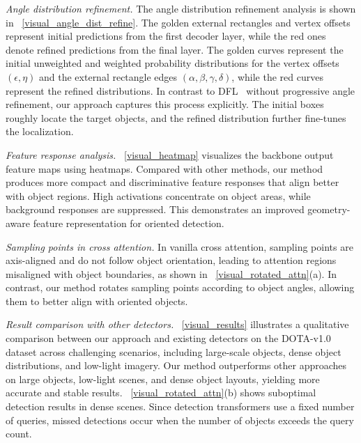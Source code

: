 \documentclass[lettersize,journal]{IEEEtran}
\begin{document}
\visualAngleDistRefine


\heatmap

\visualRoatedAttn


\textit{Angle distribution refinement.}
The angle distribution refinement analysis is shown in \figurename~\ref{visual_angle_dist_refine}. The golden external rectangles and vertex offsets represent initial predictions from the first decoder layer, while the red ones denote refined predictions from the final layer. The golden curves represent the initial unweighted and weighted probability distributions for the vertex offsets $(\epsilon,\eta)$ and the external rectangle edges $(\alpha, \beta, \gamma, \delta)$, while the red curves represent the refined distributions. In contrast to DFL~\cite{ppyoloer} without progressive angle refinement, our approach captures this process explicitly. The initial boxes roughly locate the target objects, and the refined distribution further fine-tunes the localization.


\textit{Feature response analysis.}
\figurename~\ref{visual_heatmap} visualizes the backbone output feature maps using heatmaps. 
Compared with other methods, our method produces more compact and discriminative feature responses that align better with object regions. High activations concentrate on object areas, while background responses are suppressed. This demonstrates an improved geometry-aware feature representation for oriented detection.


\textit{Sampling points in cross attention.}
In vanilla cross attention, sampling points are axis-aligned and do not follow object orientation, leading to attention regions misaligned with object boundaries, as shown in \figurename~\ref{visual_rotated_attn}(a). In contrast, our method rotates sampling points according to object angles, allowing them to better align with oriented objects.



\textit{Result comparison with other detectors.} \figurename~\ref{visual_results} illustrates a qualitative comparison between our approach and existing detectors on the DOTA-v1.0 dataset across challenging scenarios, including large-scale objects, dense object distributions, and low-light imagery. Our method outperforms other approaches on large objects, low-light scenes, and dense object layouts, yielding more accurate and stable results. 
\figurename~\ref{visual_rotated_attn}(b) shows suboptimal detection results in dense scenes. Since detection transformers use a fixed number of queries, missed detections occur when the number of objects exceeds the query count.
\end{document}
